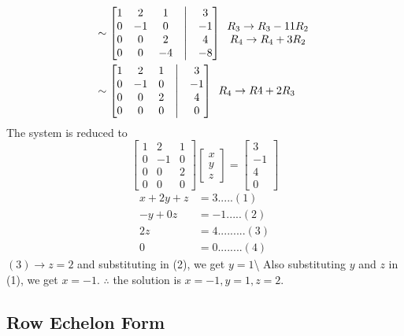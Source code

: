 \documentclass[
  letterpaper,
  DIV=11,
  numbers=noendperiod]{scrreprt}
\begin{document}
\begin{align*}
    &\sim \begin{bmatrix}
        1 &2  &1 &\bigm| &3\\
        0 &-1 &0 &\bigm| &-1\\
        0 &0 &2 &\bigm| &4\\
        0 &0 &-4 &\bigm| &-8
    \end{bmatrix}\begin{array}{c}
        R_3\rightarrow R_3-11R_2\\
        R_4\rightarrow R_4+3R_2
    \end{array}\\
    &\sim \begin{bmatrix}
        1 &2  &1 &\bigm| &3\\
        0 &-1 &0 &\bigm| &-1\\
        0 &0 &2 &\bigm| &4\\
        0 &0 &0 &\bigm| &0
    \end{bmatrix}\begin{array}{c}
        R_4\rightarrow R4+2R_3
    \end{array}
\end{align*} The system is reduced to \[\begin{bmatrix}
    1 &2 &1\\
    0 &-1 &0\\
    0 &0 &2\\
    0 &0 &0
\end{bmatrix}\begin{bmatrix}
    x\\
    y\\
    z
\end{bmatrix}=\begin{bmatrix}
    3\\
    -1\\
    4\\
    0
\end{bmatrix}\] \begin{align*}
    x+2y+z &=3.....(1)\\
    -y+0z &=-1.....(2)\\
    2z &=4 .........(3)\\
    0 &=0........(4)
\end{align*} \((3)\rightarrow z=2\) and substituting in (2), we get
\(y=1\)\textbackslash{} Also substituting \(y\) and \(z\) in (1), we get
\(x=-1\). \(\therefore\) the solution is \(x=-1, y=1, z=2\).

\subsection{Row Echelon Form}\label{row-echelon-form}
\end{document}
